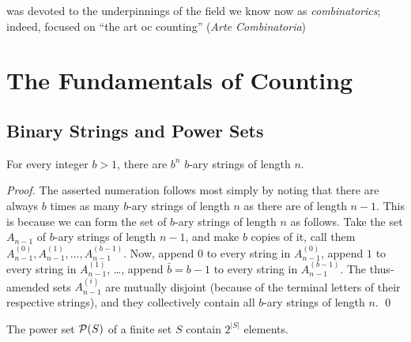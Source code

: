  was devoted to the
underpinnings of the field we know now as {\it combinatorics}; indeed, 
focused on ``the art oc counting''
({\it Arte Combinatoria}) 



\section{The Fundamentals of Counting}
\label{sec:counting}


\subsection{Binary Strings and Power Sets}

\begin{prop}
\label{thm:b-ary strings}
For every integer $b > 1$, there are $b^n$ $b$-ary strings of length
$n$.
\end{prop}

\begin{proof}
The asserted numeration follows most simply by noting that there are
always $b$ times as many $b$-ary strings of length $n$ as there are of
length $n-1$.  This is because we can form the set of $b$-ary strings
of length $n$ as follows.  Take the set $A_{n-1}$ of $b$-ary strings
of length $n-1$, and make $b$ copies of it, call them $A^{(0)}_{n-1},
A^{(1)}_{n-1}, \ldots, A^{(b-1)}_{n-1}$.  Now, append $0$ to every
string in $A^{(0)}_{n-1}$, append $1$ to every string in
$A^{(1)}_{n-1}$, \ldots, append $\bar{b} = b-1$ to every string in
$A^{(b-1)}_{n-1}$.  The thus-amended sets $A^{(i)}_{n-1}$ are mutually
disjoint (because of the terminal letters of their respective
strings), and they collectively contain all $b$-ary strings of length
$n$.  \qed
\end{proof}

\medskip


\begin{prop}
\label{thm:power-sets}
The power set $\mbox{$\cal P$}(S)$ of a finite set $S$ contain $2^{|S|}$ elements.
\end{prop}

